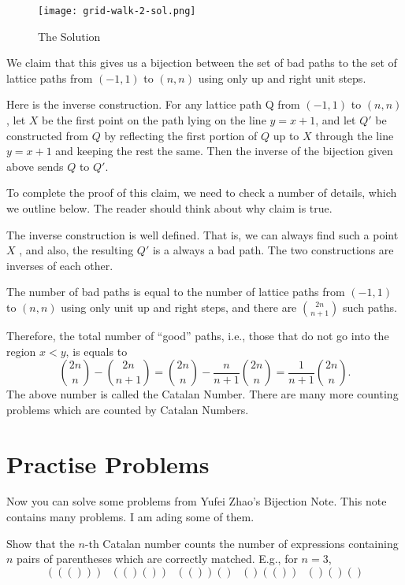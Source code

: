 \begin{figure}[ht]
\centering
	\texttt{[image: grid-walk-2-sol.png]}
	\caption{The Solution}
\end{figure}

We claim that this gives us a bijection between the set of bad paths to the set of
lattice paths from $(-1, 1)$ to $(n, n)$ using only up and right unit steps.

Here is the inverse construction. For any lattice path Q from $(-1, 1)$ to $(n, n)$, let $X$
be the first point on the path lying on the line $y = x + 1$, and let $Q'$ be constructed from
$Q$ by reflecting the first portion of $Q$ up to $X$ through the line $y = x + 1$ and keeping
the rest the same. Then the inverse of the bijection given above sends $Q$ to $Q'$.

To complete the proof of this claim, we need to check a number of details, which
we outline below. The reader should think about why claim is true.

\begin{itemize}
	\ii The inverse construction is well defined. That is, we can always find such a point
	$X$ , and also, the resulting $Q'$ is a always a bad path.
	\ii The two constructions are inverses of each other.
\end{itemize}
The number of bad paths is equal to the number of lattice paths from $(-1, 1)$ to
$(n, n)$ using only unit up and right steps, and there are $\binom{2n}{n+1}$ such paths.

Therefore, the total number of “good” paths, i.e., those that do not go into
the region $x < y$, is equals to 
\[\binom{2n}{n} -\binom{2n}{n+1} = \binom{2n}{n}-\frac{n}{n+1}\binom{2n}{n}=\frac{1}{n+1}\binom{2n}{n}.\]
The above number is called the Catalan Number. There are many more counting problems which are counted by Catalan Numbers.



\section{Practise Problems}
Now you can solve some problems from Yufei Zhao's Bijection Note. This note contains many problems. I am ading some of them.

\begin{problem}
Show that the $n$-th Catalan number counts the number of expressions
containing $n$ pairs of parentheses which are correctly matched. E.g., for $n = 3$,
\[((())) \ \ \ (()()) \ \ \ (())() \ \ \ ()(()) \ \ \ ()()()\]
\end{problem}


